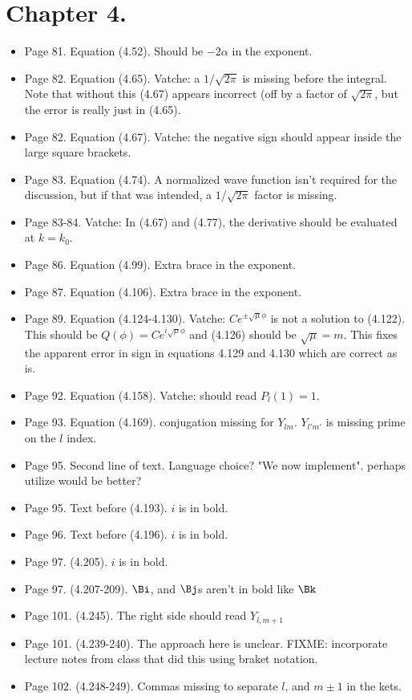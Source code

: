 \section{Chapter 4.}
\begin{itemize}
\item Page 81.  Equation (4.52).  Should be $-2\alpha$ in the exponent.
\item Page 82.  Equation (4.65).  Vatche: a $1/\sqrt{2\pi}$ is missing before the integral.  Note that without this (4.67) appears incorrect (off by a factor of $\sqrt{2\pi}$, but the error is really just in (4.65).
\item Page 82.  Equation (4.67).  Vatche: the negative sign should appear inside the large square brackets.
\item Page 83.  Equation (4.74).  A normalized wave function isn't required for the discussion, but if that was intended, a $1/\sqrt{2\pi}$ factor is missing.
\item Page 83-84.  Vatche: In (4.67) and (4.77), the derivative should be evaluated at $k=k_0$.
\item Page 86.  Equation (4.99).  Extra brace in the exponent.
\item Page 87.  Equation (4.106).  Extra brace in the exponent.
\item Page 89.  Equation (4.124-4.130).  Vatche: $C e^{\pm \sqrt{\mu}\phi}$ is not a solution to (4.122).  This should be $Q(\phi) = C e^{i \sqrt{\mu} \phi}$ and (4.126) should be $\sqrt{\mu} = m$.  This fixes the apparent error in sign in equations 4.129 and 4.130 which are correct as is.
\item Page 92.  Equation (4.158).  Vatche: should read $P_l(1) = 1$.
\item Page 93.  Equation (4.169).  conjugation missing for $Y_{lm}$.  $Y_{l'm'}$ is missing prime on the $l$ index.
\item Page 95.  Second line of text.  Language choice?  "We now implement".  perhaps utilize would be better?
\item Page 95.  Text before (4.193).  $i$ is in bold.
\item Page 96.  Text before (4.196).  $i$ is in bold.
\item Page 97.  (4.205).  $i$ is in bold.
\item Page 97.  (4.207-209).  $\Bi$, and $\Bj$s aren't in bold like $\Bk$
\item Page 101.  (4.245).  The right side should read $Y_{l,m+1}$
\item Page 101.  (4.239-240).  The approach here is unclear.  FIXME: incorporate lecture notes from class that did this using braket notation.
\item Page 102.  (4.248-249).  Commas missing to separate $l$, and $m\pm 1$ in the kets.
\end{itemize}

